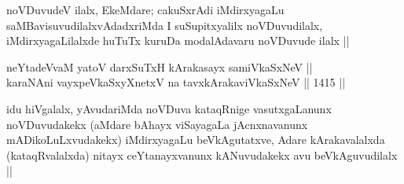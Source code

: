\begin{artha}
noVDuvudeV ilalx, EkeMdare; cakuSxrAdi iMdirxyagaLu saMBavisuvudilalxvAdadxriMda I suSupitxyalilx noVDuvudilalx, iMdirxyagaLilalxde huTuTx kuruDa modalAdavaru noVDuvude ilalx ||
\end{artha}


\begin{shl}
neYtadeVvaM yatoV darxSuTxH kArakasayx samiVkaSxNeV || \\
karaNAni vayxpeVkaSxyXnetxV na tavxkArakaviVkaSxNeV \hfill || 1415 || 
\end{shl}

\begin{artha}
idu hiVgalalx, yAvudariMda noVDuva kataqRnige vasutxgaLanunx noVDuvudakekx (aMdare bAhayx viSayagaLa jAcnxnavanunx mADikoLuLxvudakekx) iMdirxyagaLu beVkAgutatxve, Adare kArakavalalxda (kataqRvalalxda) nitayx ceYtanayxvanunx kANuvudakekx avu beVkAguvudilalx ||
\end{artha}
